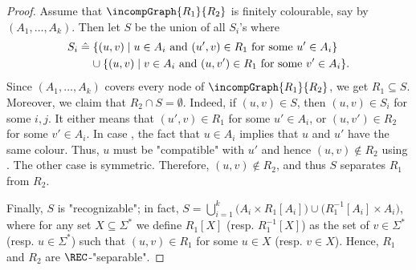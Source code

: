 \begin{proof}
     Assume that $\incompGraph{R_1}{R_2}$ is finitely colourable, say by
    $(A_1,\hdots,A_k)$. Then let $S$ be the union of all $S_i$'s where
    \begin{align*}
        S_{i} & \defeq \{(u,v) \mid u \in A_i \text{ and } (u',v) \in R_1 \text{ for some } u' \in A_i \}\\
&         \hphantom{\defeq~}\cup \{(u,v) \mid v \in A_i \text{ and } (u,v') \in R_1 \text{ for some } v' \in A_i \}.  
    \end{align*}
    Since $(A_1,\hdots,A_k)$ covers every node of $\incompGraph{R_1}{R_2}$, we get $R_1 \subseteq S$.
    Moreover, we claim that $R_2 \cap S = \emptyset$. Indeed, if $(u,v) \in S$,
    then $(u,v) \in S_{i}$ for some $i,j$. It either means that 
    $(u',v) \in R_1$ for some $u' \in A_i$, or  $(u,v') \in R_2$
    for some $v' \in A_i$. In case , the fact that $u \in A_i$ implies that $u$ and $u'$
    have the same colour. Thus, $u$ must be "compatible" with $u'$ and hence
    $(u,v) \not\in R_2$ using \compLpr. The other case is symmetric.
    Therefore, $(u,v) \not\in R_2$, and thus $S$ separates $R_1$ from $R_2$.

    Finally,  $S$ is "recognizable"; in fact, 
    $S = \bigcup_{i=1}^k \bigl( A_i \times R_1[A_i] \bigr) \cup \bigl( R_1^{-1}[A_i] \times A_i \bigr)$, 
    where for any set $X \subseteq \Sigma^*$ we define $R_1[X]$ (resp. $R_1^{-1}[X]$) as the set
    of $v\in \Sigma^*$ (resp. $u \in \Sigma^*$) such that $(u,v) \in R_1$ for some $u \in X$
    (resp. $v\in X$).
    Hence, $R_1$ and $R_2$ are $\REC$-"separable". 
\end{proof}


